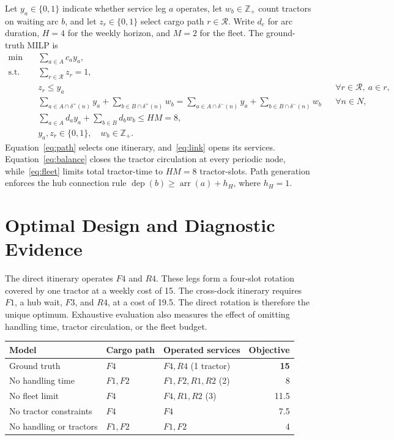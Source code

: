 \documentclass[10pt]{article}
\begin{document}
Let $y_a\in\{0,1\}$ indicate whether service leg $a$ operates, let $w_b\in\mathbb Z_+$ count tractors on waiting arc $b$, and let $z_r\in\{0,1\}$ select cargo path $r\in\mathcal R$. Write $d_e$ for arc duration, $H=4$ for the weekly horizon, and $M=2$ for the fleet. The ground-truth MILP is
\begin{align}
\min\quad &\sum_{a\in A}c_a y_a, \label{eq:obj}\\
\text{s.t.}\quad
&\sum_{r\in\mathcal R}z_r=1, \label{eq:path}\\
&z_r\le y_a &&\forall r\in\mathcal R,\ a\in r, \label{eq:link}\\
&\sum_{a\in A\cap\delta^+(n)}y_a+\sum_{b\in B\cap\delta^+(n)}w_b
=\sum_{a\in A\cap\delta^-(n)}y_a+\sum_{b\in B\cap\delta^-(n)}w_b
&&\forall n\in N, \label{eq:balance}\\
&\sum_{a\in A}d_a y_a+\sum_{b\in B}d_b w_b\le HM=8, \label{eq:fleet}\\
&y_a,z_r\in\{0,1\},\quad w_b\in\mathbb Z_+. \label{eq:domain}
\end{align}
Equation~\eqref{eq:path} selects one itinerary, and~\eqref{eq:link} opens its services. Equation~\eqref{eq:balance} closes the tractor circulation at every periodic node, while~\eqref{eq:fleet} limits total tractor-time to $HM=8$ tractor-slots. Path generation enforces the hub connection rule $\operatorname{dep}(b)\ge\operatorname{arr}(a)+h_H$, where $h_H=1$.

\section{Optimal Design and Diagnostic Evidence}

The direct itinerary operates $F4$ and $R4$. These legs form a four-slot rotation covered by one tractor at a weekly cost of 15. The cross-dock itinerary requires $F1$, a hub wait, $F3$, and $R4$, at a cost of 19.5. The direct rotation is therefore the unique optimum. Exhaustive evaluation also measures the effect of omitting handling time, tractor circulation, or the fleet budget.

\begin{center}
\begin{tabularx}{0.98\linewidth}{Y l l r}
\toprule
Model & Cargo path & Operated services & Objective \\
\midrule
Ground truth & $F4$ & $F4,R4$ (1 tractor) & \textbf{15} \\
No handling time & $F1,F2$ & $F1,F2,R1,R2$ (2) & 8 \\
No fleet limit & $F4$ & $F4,R1,R2$ (3) & 11.5 \\
No tractor constraints & $F4$ & $F4$ & 7.5 \\
No handling or tractors & $F1,F2$ & $F1,F2$ & 4 \\
\bottomrule
\end{tabularx}
\end{center}
\end{document}
